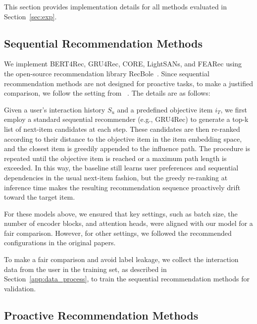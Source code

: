 This section provides implementation details for all methods evaluated in Section~\ref{sec:exp}.

\subsection{Sequential Recommendation Methods}

We implement BERT4Rec, GRU4Rec, CORE, LightSANs, and FEARec using the open-source recommendation library RecBole~\cite{zhao2021recbole}. Since sequential recommendation methods are not designed for proactive tasks, to make a justified comparison, we follow the setting from ~\cite{zhao2021recbole}. The details are as follows: 

Given a user's interaction history $S_u$ and a predefined objective item $i_T$, we first employ a standard sequential recommender (e.g., GRU4Rec) to generate a top-k list of next-item candidates at each step. These candidates are then re-ranked according to their distance to the objective item in the item embedding space, and the closest item is greedily appended to the influence path. The procedure is repeated until the objective item is reached or a maximum path length is exceeded. In this way, the baseline still learns user preferences and sequential dependencies in the usual next-item fashion, but the greedy re-ranking at inference time makes the resulting recommendation sequence proactively drift toward the target item.

For these models above, we ensured that key settings, such as batch size, the number of encoder blocks, and attention heads, were aligned with our model for a fair comparison. However, for other settings, we followed the recommended configurations in the original papers.

To make a fair comparison and avoid label leakage, we collect the interaction data from the user in the training set, as described in Section~\ref{app:data_process}, to train the sequential recommendation methods for validation.

\subsection{Proactive Recommendation Methods}

